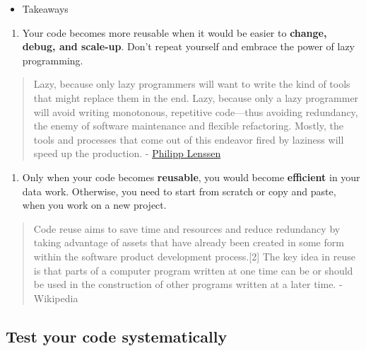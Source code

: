 \documentclass[
  letterpaper,
  DIV=11,
  numbers=noendperiod]{scrreprt}
\providecommand{\tightlist}{%
  \setlength{\itemsep}{0pt}\setlength{\parskip}{0pt}}\usepackage{longtable,booktabs,array}
\begin{document}
\begin{itemize}
\tightlist
\item
  Takeaways
\end{itemize}

\begin{enumerate}
\def\labelenumi{\arabic{enumi}.}
\tightlist
\item
  Your code becomes more reusable when it would be easier to
  \textbf{change, debug, and scale-up}. Don't repeat yourself and
  embrace the power of lazy programming.
\end{enumerate}

\begin{quote}
Lazy, because only lazy programmers will want to write the kind of tools
that might replace them in the end. Lazy, because only a lazy programmer
will avoid writing monotonous, repetitive code---thus avoiding
redundancy, the enemy of software maintenance and flexible refactoring.
Mostly, the tools and processes that come out of this endeavor fired by
laziness will speed up the production. -
\href{http://blogoscoped.com/archive/2005-08-24-n14.html}{Philipp
Lenssen}
\end{quote}

\begin{enumerate}
\def\labelenumi{\arabic{enumi}.}
\setcounter{enumi}{1}
\tightlist
\item
  Only when your code becomes \textbf{reusable}, you would become
  \textbf{efficient} in your data work. Otherwise, you need to start
  from scratch or copy and paste, when you work on a new project.
\end{enumerate}

\begin{quote}
Code reuse aims to save time and resources and reduce redundancy by
taking advantage of assets that have already been created in some form
within the software product development process.{[}2{]} The key idea in
reuse is that parts of a computer program written at one time can be or
should be used in the construction of other programs written at a later
time. - Wikipedia
\end{quote}

\hypertarget{test-your-code-systematically}{%
\subsection*{Test your code
systematically}\label{test-your-code-systematically}}
\end{document}
